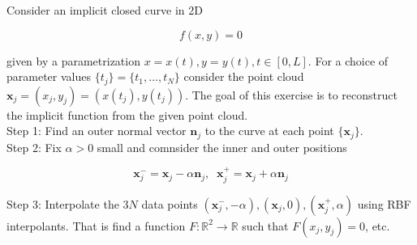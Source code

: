 Consider an implicit closed curve in 2D

$$f(x,y)=0$$

given by a parametrization $x=x(t), y=y(t), t\in[0,L]$. For a choice of parameter values
$\{t_j\}=\{t_1,\ldots,t_N\}$ consider the point cloud $\textbf{x}_j=(x_j,y_j)=(x(t_j),y(t_j))$. The goal
of this exercise is to reconstruct the implicit function from the given point cloud.\\

Step 1: Find an outer normal vector $\textbf{n}_j$ to the curve at each point $\{\textbf{x}_j\}$.\\

Step 2: Fix $\alpha>0$ small and comnsider the inner and outer positions

$$\textbf{x}_j^-=\textbf{x}_j-\alpha\textbf{n}_j,\;\;\textbf{x}_j^+=\textbf{x}_j+\alpha\textbf{n}_j$$

Step 3: Interpolate the $3N$ data points
$(\textbf{x}_j^-,-\alpha),(\textbf{x}_j,0),(\textbf{x}_j^+,\alpha)$ using RBF interpolants. That is find
a function $F:\mathbb{R}^2\to\mathbb{R}$ such that $F(x_j,y_j)=0$, etc.